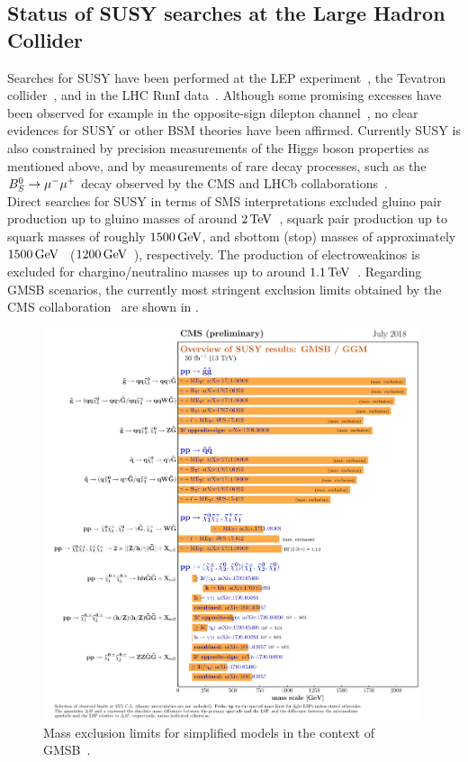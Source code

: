 \subsection{Status of SUSY searches at the Large Hadron Collider}
Searches for SUSY have been performed  at the LEP experiment~\cite{LEP}, the Tevatron collider~\cite{TEVATRON}, and in the LHC RunI data~\cite{ChristianRunI}. Although some promising excesses have been observed for example in the opposite-sign dilepton channel~\cite{Edge}, no clear evidences for SUSY or other BSM theories have been affirmed. Currently SUSY is also constrained by precision measurements of the Higgs boson properties as mentioned above, and by measurements of rare decay processes, such as the $B_S^0\to{\mu^-}{\mu^+}$ decay observed by the CMS and LHCb collaborations~\cite{B0S}.\\
Direct searches for SUSY in terms of SMS interpretations excluded gluino pair production up to gluino masses of around $2\,\text{Te\hspace{-.08em}V}$~\cite{GluinoCMS}, squark pair production up to squark masses of roughly $1500\,\text{Ge\hspace{-.08em}V}$, and sbottom (stop) masses of approximately $1500\,\text{Ge\hspace{-.08em}V}$~\cite{sbottom} ($1200\,\text{Ge\hspace{-.08em}V}$~\cite{stop}), respectively. The production of electroweakinos is excluded for chargino/neutralino masses up to around $1.1\,\text{Te\hspace{-.08em}V}$~\cite{EWKinos}.
Regarding GMSB scenarios, the currently most stringent exclusion limits obtained by the CMS collaboration~\cite{CMS} are shown in .\\
\begin{figure}[tbp]
 \centering
 \includegraphics[width=0.99\textwidth]{figures/general/barplot_GMSB}
 \caption{Mass exclusion limits for simplified models in the context of GMSB~\cite{SUSSummaryPlot}.}
 \label{fig:GMSB_summary}
\end{figure}
